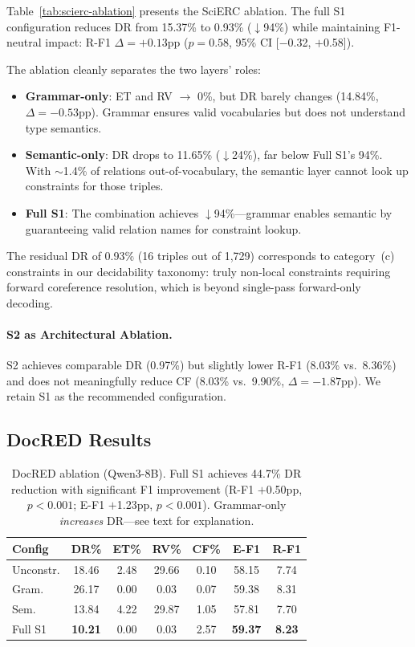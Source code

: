 \documentclass[11pt,a4paper]{article}
\begin{document}
Table~\ref{tab:scierc-ablation} presents the SciERC ablation.
The full S1 configuration reduces DR from 15.37\% to 0.93\% ($\downarrow$94\%) while maintaining F1-neutral impact: R-F1 $\Delta{=}{+}0.13$pp ($p{=}0.58$, 95\% CI [$-$0.32, $+$0.58]).

The ablation cleanly separates the two layers' roles:
\begin{itemize}
\item \textbf{Grammar-only}: ET and RV $\to$ 0\%, but DR barely changes (14.84\%, $\Delta{=}{-}0.53$pp). Grammar ensures valid vocabularies but does not understand type semantics.
\item \textbf{Semantic-only}: DR drops to 11.65\% ($\downarrow$24\%), far below Full S1's 94\%. With $\sim$1.4\% of relations out-of-vocabulary, the semantic layer cannot look up constraints for those triples.
\item \textbf{Full S1}: The combination achieves $\downarrow$94\%---grammar enables semantic by guaranteeing valid relation names for constraint lookup.
\end{itemize}

The residual DR of 0.93\% (16 triples out of 1,729) corresponds to category~(c) constraints in our decidability taxonomy: truly non-local constraints requiring forward coreference resolution, which is beyond single-pass forward-only decoding.

\paragraph{S2 as Architectural Ablation.}
S2 achieves comparable DR (0.97\%) but slightly lower R-F1 (8.03\% vs.\ 8.36\%) and does not meaningfully reduce CF (8.03\% vs.\ 9.90\%, $\Delta{=}{-}1.87$pp).
We retain S1 as the recommended configuration.

\subsection{DocRED Results}

\begin{table}[t]
\centering
\small
\begin{tabular}{lcccccc}
\toprule
\textbf{Config} & \textbf{DR\%} & \textbf{ET\%} & \textbf{RV\%} & \textbf{CF\%} & \textbf{E-F1} & \textbf{R-F1} \\
\midrule
Unconstr. & 18.46 & 2.48 & 29.66 & 0.10 & 58.15 & 7.74 \\
Gram. & 26.17 & 0.00 & 0.03 & 0.07 & 59.38 & 8.31 \\
Sem. & 13.84 & 4.22 & 29.87 & 1.05 & 57.81 & 7.70 \\
Full S1 & \textbf{10.21} & 0.00 & 0.03 & 2.57 & \textbf{59.37} & \textbf{8.23} \\
\bottomrule
\end{tabular}
\caption{DocRED ablation (Qwen3-8B). Full S1 achieves 44.7\% DR reduction with significant F1 improvement (R-F1 $+$0.50pp, $p{<}0.001$; E-F1 $+$1.23pp, $p{<}0.001$). Grammar-only \emph{increases} DR---see text for explanation.}
\label{tab:docred-ablation}
\end{table}
\end{document}
